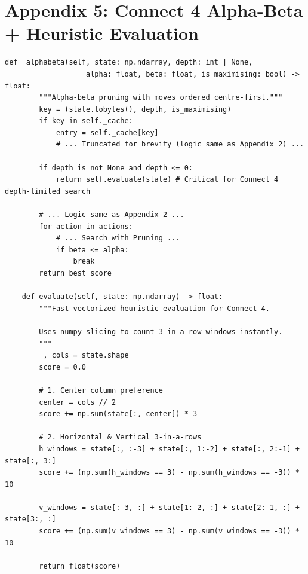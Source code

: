 \section{Appendix 5: Connect 4 Alpha-Beta + Heuristic Evaluation}
{\small
\begin{lstlisting}[style=mypython]
    def _alphabeta(self, state: np.ndarray, depth: int | None,
                   alpha: float, beta: float, is_maximising: bool) -> float:
        """Alpha-beta pruning with moves ordered centre-first."""
        key = (state.tobytes(), depth, is_maximising)
        if key in self._cache:
            entry = self._cache[key]
            # ... Truncated for brevity (logic same as Appendix 2) ...

        if depth is not None and depth <= 0:
            return self.evaluate(state) # Critical for Connect 4 depth-limited search

        # ... Logic same as Appendix 2 ...
        for action in actions:
            # ... Search with Pruning ...
            if beta <= alpha:
                break
        return best_score

    def evaluate(self, state: np.ndarray) -> float:
        """Fast vectorized heuristic evaluation for Connect 4.
        
        Uses numpy slicing to count 3-in-a-row windows instantly.
        """
        _, cols = state.shape
        score = 0.0
        
        # 1. Center column preference
        center = cols // 2
        score += np.sum(state[:, center]) * 3
        
        # 2. Horizontal & Vertical 3-in-a-rows
        h_windows = state[:, :-3] + state[:, 1:-2] + state[:, 2:-1] + state[:, 3:]
        score += (np.sum(h_windows == 3) - np.sum(h_windows == -3)) * 10
        
        v_windows = state[:-3, :] + state[1:-2, :] + state[2:-1, :] + state[3:, :]
        score += (np.sum(v_windows == 3) - np.sum(v_windows == -3)) * 10
        
        return float(score)
\end{lstlisting}
}

